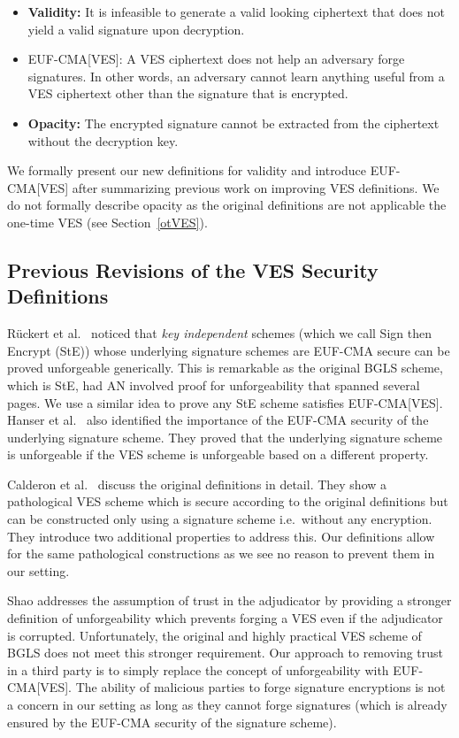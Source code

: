 \documentclass[fullpage]{article}
\theoremstyle{definition}
\newcommand{\EUFCMA}{\textsf{EUF-CMA}\xspace}
\newcommand{\EUFCMAVES}{\textsf{EUF-CMA}[\textsf{VES}]\xspace}
\begin{document}
\begin{itemize}
    \item \textbf{Validity:} It is infeasible to generate a valid looking ciphertext that does not yield a valid signature upon decryption.
    \item \EUFCMAVES: A VES ciphertext does not help an adversary forge signatures. In other words, an adversary cannot learn anything useful from a VES ciphertext other than the signature that is encrypted.
    \item \textbf{Opacity:} The encrypted signature cannot be extracted from the ciphertext without the decryption key.
\end{itemize}


We formally present our new definitions for validity and introduce \EUFCMAVES after summarizing previous work on improving VES definitions. We do not formally describe opacity as the original definitions are not applicable the one-time VES (see Section~\ref{otVES}).

\subsection{Previous Revisions of the VES Security Definitions}

Rückert et al.\ \cite{Ruckert:2009:SVE:1615384.1615387} noticed that \emph{key independent} schemes (which we call Sign then Encrypt (StE)) whose underlying signature schemes are \EUFCMA secure can be proved unforgeable generically. This is remarkable as the original BGLS scheme, which is StE, had AN involved proof for unforgeability that spanned several pages. We use a similar idea to prove any StE scheme satisfies \EUFCMAVES\@. Hanser et al.\ \cite{VES-structure-preserving} also identified the importance of the \EUFCMA security of the underlying signature scheme. They proved that the underlying signature scheme is unforgeable if the VES scheme is unforgeable based on a different property.

Calderon et al.\ \cite{calderon2014rethinking} discuss the original definitions in detail. They show a pathological VES scheme which is secure according to the original definitions but can be constructed only using a signature scheme i.e.\ without any encryption. They introduce two additional properties to address this. Our definitions allow for the same pathological constructions as we see no reason to prevent them in our setting.

Shao \cite{SHAO20081961} addresses the assumption of trust in the adjudicator by providing a stronger definition of unforgeability which prevents forging a VES even if the adjudicator is corrupted. Unfortunately, the original and highly practical VES scheme of BGLS does not meet this stronger requirement. Our approach to removing trust in a third party is to simply replace the concept of unforgeability with \EUFCMAVES\@. The ability of malicious parties to forge signature encryptions is not a concern in our setting as long as they cannot forge signatures (which is already ensured by the \EUFCMA security of the signature scheme).
\end{document}
